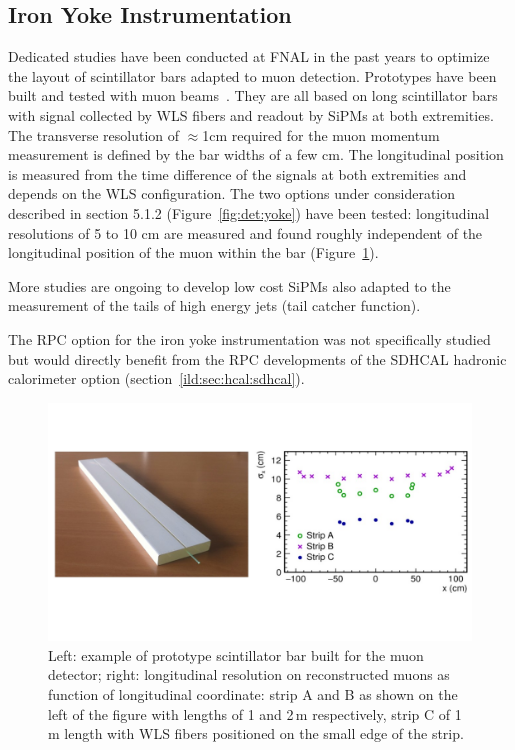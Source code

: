 \subsection{Iron Yoke Instrumentation}

Dedicated studies have been conducted at FNAL in the past years to optimize the layout of scintillator bars adapted to muon detection. Prototypes have been built and tested with muon beams~\cite{Denisov:2015jjl}. They are all based on long scintillator bars with signal collected by WLS fibers and readout by SiPMs at both extremities. The transverse resolution of $\approx$1cm required for the muon momentum measurement is defined by the bar widths of a few cm. The longitudinal position is measured from the time difference of the signals at both extremities and depends on the WLS configuration. The two options under consideration described in section 5.1.2 (Figure~\ref{fig:det:yoke}) have been tested: longitudinal resolutions of 5 to 10 cm are measured and found roughly independent of the longitudinal position of the muon within the bar (Figure~\ref{fig:det:Iron_proto}). 

More studies are ongoing to develop low cost SiPMs also adapted to the measurement of the tails of high energy jets (tail catcher function). 

The RPC option for the iron yoke instrumentation was not specifically studied but would directly benefit from the RPC developments of the SDHCAL hadronic calorimeter option (section~\ref{ild:sec:hcal:sdhcal}).   


\begin{figure}[t!]
\centering
\includegraphics[width=1.0\hsize]{Detector/fig/Iron_proto.jpg}
\caption{Left: example of prototype scintillator bar built for the muon detector; right: longitudinal resolution on reconstructed muons as function of longitudinal coordinate: strip A and B as shown on the left of the figure with lengths of 1 and 2\,m respectively, strip C of 1\,m length with WLS fibers positioned on the small edge of the strip.}
\label{fig:det:Iron_proto}
\end{figure}
\hfill

